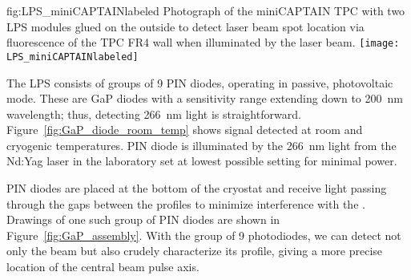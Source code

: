 \begin{dunefigure}{fig:LPS_miniCAPTAINlabeled}
{Photograph of the miniCAPTAIN TPC with two LPS modules glued on the outside to detect laser beam spot location via fluorescence of the TPC FR4 wall when illuminated by the laser beam.}
\texttt{[image: LPS\_miniCAPTAINlabeled]} 
\end{dunefigure}

The LPS consists of groups of \num{9} PIN diodes, operating in passive, photovoltaic mode. These are GaP diodes with a sensitivity range extending down to  \SI{200}{\nano\m} wavelength; thus, detecting \SI{266}{\nano\m} light is straightforward. Figure~\ref{fig:GaP_diode_room_temp} shows signal detected at room and cryogenic temperatures. PIN diode is illuminated by the \SI{266}{\nano\m} light from the Nd:Yag
laser in the laboratory 
set at lowest possible setting for minimal power.  

PIN diodes are placed at the bottom of the cryostat and receive light passing through the gaps between the  profiles to minimize interference with the . Drawings of one such group of PIN diodes are shown in Figure~\ref{fig:GaP_assembly}. With the group of \num{9} photodiodes, we can detect not only the beam but also crudely characterize its profile, giving a more precise location of the central beam pulse axis.




